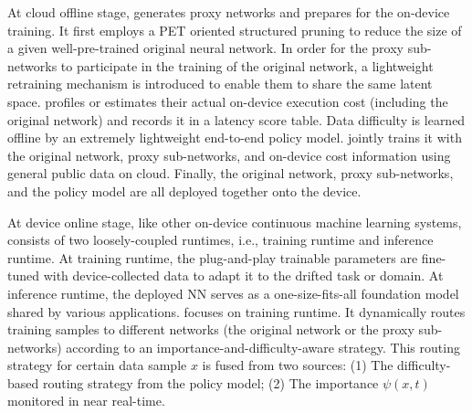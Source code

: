 At cloud offline stage, \sys generates proxy networks and prepares for the on-device training.
 It first employs a PET oriented structured pruning to reduce the size of a given well-pre-trained original neural network. 
 In order for the proxy sub-networks to participate in the training of the original network, a lightweight retraining mechanism is introduced to enable them to share the same latent space.
 \sys profiles or estimates their actual on-device execution cost (including the original network) and records it in a latency score table.
 Data difficulty is learned offline by an extremely lightweight end-to-end policy model.
\sys jointly trains it with the original network, proxy sub-networks, and on-device cost information using general public data on cloud.
 Finally, the original network, proxy sub-networks, and the policy model are all deployed together onto the device.

At device online stage, like other on-device continuous machine learning systems, \sys consists of two loosely-coupled runtimes, i.e., training runtime and inference runtime.
At training runtime, the plug-and-play trainable parameters are fine-tuned with device-collected data to adapt it to the drifted task or domain.
At inference runtime, the deployed NN serves as a one-size-fits-all foundation model shared by various applications.
\sys focuses on training runtime.
It dynamically routes training samples to different networks (the original network or the proxy sub-networks) according to an importance-and-difficulty-aware strategy.
This routing strategy for certain data sample $x$ is fused from two sources:
(1) The difficulty-based routing strategy from the policy model;
(2) The importance $\psi(x, t)$ monitored in near real-time.


